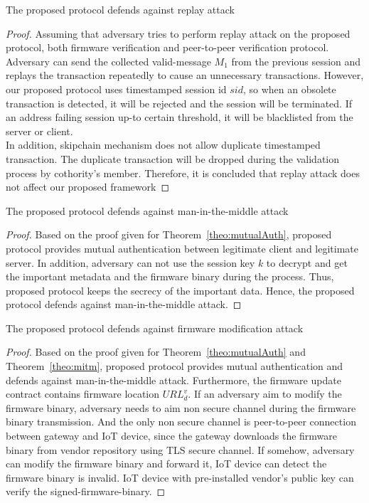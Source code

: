 \begin{theorem}
	The proposed protocol defends against replay attack
\end{theorem}
\begin{proof}
	Assuming that adversary tries to perform replay attack on the proposed protocol, both firmware verification and peer-to-peer verification protocol. Adversary can send the collected valid-message $M_1$ from the previous session and replays the transaction repeatedly to cause an unnecessary transactions. However, our proposed protocol uses timestamped session id $sid$, so when an obsolete transaction is detected, it will be rejected and the session will be terminated. If an address failing session up-to certain threshold, it will be blacklisted from the server or client.\\
	\indent In addition, skipchain mechanism does not allow duplicate timestamped transaction. The duplicate transaction will be dropped during the validation process by cothority's member. Therefore, it is concluded that replay attack does not affect our proposed framework
\end{proof}

\begin{theorem}
	\label{theo:mitm}
	The proposed protocol defends against man-in-the-middle attack
\end{theorem}
\begin{proof}
	Based on the proof given for Theorem~\ref{theo:mutualAuth}, proposed protocol provides mutual authentication between legitimate client and legitimate server. In addition, adversary can not use the session key $k$ to decrypt and get the important metadata and the firmware binary during the process. Thus, proposed protocol keeps the secrecy of the important data. Hence, the proposed protocol defends against man-in-the-middle attack.
\end{proof}

\begin{theorem}
	The proposed protocol defends against firmware modification attack
\end{theorem}
\begin{proof}
	Based on the proof given for Theorem~\ref{theo:mutualAuth} and Theorem~\ref{theo:mitm}, proposed protocol provides mutual authentication and defends against man-in-the-middle attack. Furthermore, the firmware update contract contains firmware location $URL^v_d$. If an adversary aim to modify the firmware binary, adversary needs to aim non secure channel during the firmware binary transmission. And the only non secure channel is peer-to-peer connection between gateway and IoT device, since the gateway downloads the firmware binary from vendor repository using TLS secure channel. If somehow, adversary can modify the firmware binary and forward it, IoT device can detect the firmware binary is invalid. IoT device with pre-installed vendor's public key can verify the signed-firmware-binary.
\end{proof}

